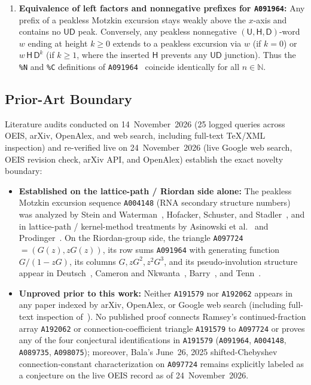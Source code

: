 \documentclass[11pt]{article}
\theoremstyle{definition}
\newcommand{\N}{\mathbb{N}}
\newcommand{\seq}[1]{\texttt{#1}}
\newcommand{\StepU}{\mathsf{U}}
\newcommand{\StepH}{\mathsf{H}}
\newcommand{\StepD}{\mathsf{D}}
\begin{document}
\begin{enumerate}
\item \textbf{Equivalence of left factors and nonnegative prefixes for \seq{A091964}:} Any prefix of a peakless Motzkin excursion stays weakly above the $x$-axis and contains no $\StepU\StepD$ peak. Conversely, any peakless nonnegative $(\StepU, \StepH, \StepD)$-word $w$ ending at height $k \ge 0$ extends to a peakless excursion via $w$ (if $k = 0$) or $w\,\StepH\,\StepD^k$ (if $k \ge 1$, where the inserted $\StepH$ prevents any $\StepU\StepD$ junction). Thus the \texttt{\%N} and \texttt{\%C} definitions of \seq{A091964}~\cite{oeis091964} coincide identically for all $n \in \N$.
\end{enumerate}

\subsection{Prior-Art Boundary}

Literature audits conducted on 14~November~2026 (25 logged queries across OEIS, arXiv, OpenAlex, and web search, including full-text TeX/XML inspection) and re-verified live on 24~November~2026 (live Google web search, OEIS revision check, arXiv API, and OpenAlex) establish the exact novelty boundary:
\begin{itemize}
\item \textbf{Established on the lattice-path / Riordan side alone:} The peakless Motzkin excursion sequence \seq{A004148} (RNA secondary structure numbers) was analyzed by Stein and Waterman~\cite{stein1979}, Hofacker, Schuster, and Stadler~\cite{hofacker1998}, and in lattice-path / kernel-method treatments by Asinowski et al.~\cite{asinowski2019} and Prodinger~\cite{prodinger2023,prodinger2025}. On the Riordan-group side, the triangle \seq{A097724} $= (G(z), z G(z))$, its row sums \seq{A091964} with generating function $G/(1 - z G)$, its columns $G, z G^2, z^2 G^3$, and its pseudo-involution structure appear in Deutsch~\cite{oeis097724}, Cameron and Nkwanta~\cite{cameron2005}, Barry~\cite{barry2022}, and Tenn~\cite{tenn2026}.
\item \textbf{Unproved prior to this work:} Neither \seq{A191579} nor \seq{A192062} appears in any paper indexed by arXiv, OpenAlex, or Google web search (including full-text inspection of~\cite{barry2022,prodinger2025,tenn2026}). No published proof connects Ramsey's continued-fraction array \seq{A192062} or connection-coefficient triangle \seq{A191579} to \seq{A097724} or proves any of the four conjectural identifications in \seq{A191579} (\seq{A091964}, \seq{A004148}, \seq{A089735}, \seq{A098075}); moreover, Bala's June~26, 2025 shifted-Chebyshev connection-constant characterization on \seq{A097724} remains explicitly labeled as a conjecture on the live OEIS record as of 24~November~2026.
\end{itemize}
\end{document}
